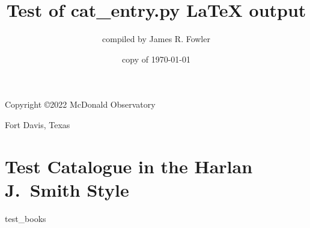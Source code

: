 \documentclass[10pt,letterpaper]{book}
\begin{document}
\frontmatter
\pagestyle{empty}
\title{Test of cat\_entry.py LaTeX output}
\author{compiled by James R. Fowler}
\date{copy of \today}
\maketitle
\clearpage

\vspace*{5 in}
\centerline{Copyright \copyright 2022 McDonald Observatory}
\centerline{Fort Davis, Texas}

\mainmatter
\section*{Test Catalogue in the Harlan J.~Smith Style}
{test\_books}
\end{document}
